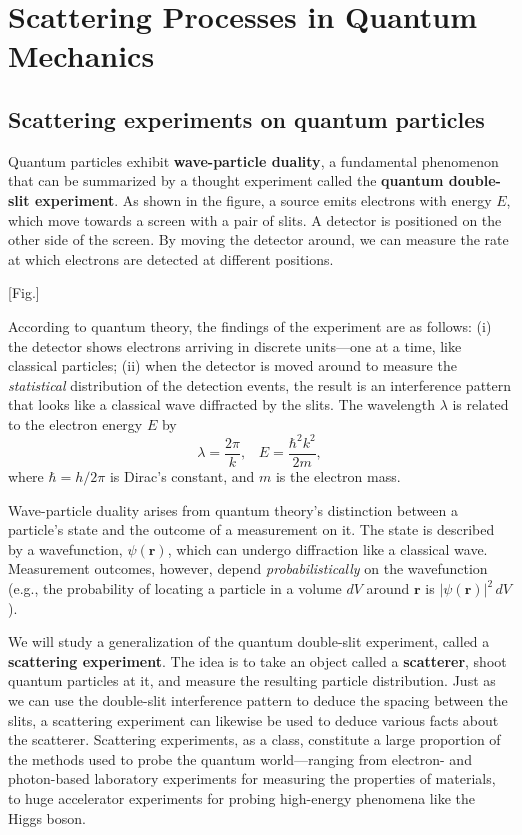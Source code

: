 \documentclass[pra,11pt]{revtex4}
\begin{document}
\section{Scattering Processes in Quantum Mechanics}

\subsection{Scattering experiments on quantum particles}

Quantum particles exhibit \textbf{wave-particle duality}, a
fundamental phenomenon that can be summarized by a thought experiment
called the \textbf{quantum double-slit experiment}.  As shown in the
figure, a source emits electrons with energy $E$, which move towards a
screen with a pair of slits.  A detector is positioned on the other
side of the screen.  By moving the detector around, we can measure the
rate at which electrons are detected at different positions.

[Fig.]

According to quantum theory, the findings of the experiment are as
follows: (i) the detector shows electrons arriving in discrete
units---one at a time, like classical particles; (ii) when the
detector is moved around to measure the \textit{statistical}
distribution of the detection events, the result is an interference
pattern that looks like a classical wave diffracted by the slits.  The
wavelength $\lambda$ is related to the electron energy $E$ by
$$\lambda = \frac{2\pi}{k}, \;\;\; E = \frac{\hbar^2k^2}{2m},$$
where $\hbar = h/2\pi$ is Dirac's constant, and $m$ is the electron
mass.

Wave-particle duality arises from quantum theory's distinction between
a particle's state and the outcome of a measurement on it.  The state
is described by a wavefunction, $\psi(\mathbf{r})$, which can undergo
diffraction like a classical wave.  Measurement outcomes, however,
depend \textit{probabilistically} on the wavefunction (e.g., the
probability of locating a particle in a volume $dV$ around
$\mathbf{r}$ is $|\psi(\mathbf{r})|^2 \,dV$).

We will study a generalization of the quantum double-slit experiment,
called a \textbf{scattering experiment}.  The idea is to take an
object called a \textbf{scatterer}, shoot quantum particles at it, and
measure the resulting particle distribution.  Just as we can use the
double-slit interference pattern to deduce the spacing between the
slits, a scattering experiment can likewise be used to deduce various
facts about the scatterer.  Scattering experiments, as a class,
constitute a large proportion of the methods used to probe the quantum
world---ranging from electron- and photon-based laboratory experiments
for measuring the properties of materials, to huge accelerator
experiments for probing high-energy phenomena like the Higgs boson.
\end{document}
